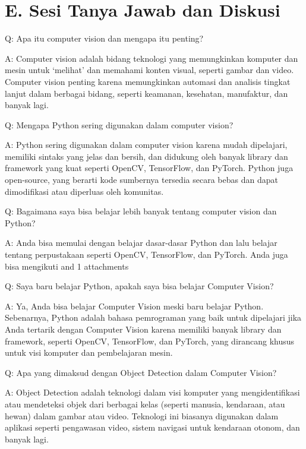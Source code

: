 \documentclass[
  letterpaper,
  DIV=11,
  numbers=noendperiod]{scrreprt}
\begin{document}
\hypertarget{e.-sesi-tanya-jawab-dan-diskusi}{%
\section*{E. Sesi Tanya Jawab dan
Diskusi}\label{e.-sesi-tanya-jawab-dan-diskusi}}


Q: Apa itu computer vision dan mengapa itu penting?

A: Computer vision adalah bidang teknologi yang memungkinkan komputer
dan mesin untuk `melihat' dan memahami konten visual, seperti gambar dan
video. Computer vision penting karena memungkinkan automasi dan analisis
tingkat lanjut dalam berbagai bidang, seperti keamanan, kesehatan,
manufaktur, dan banyak lagi.

Q: Mengapa Python sering digunakan dalam computer vision?

A: Python sering digunakan dalam computer vision karena mudah
dipelajari, memiliki sintaks yang jelas dan bersih, dan didukung oleh
banyak library dan framework yang kuat seperti OpenCV, TensorFlow, dan
PyTorch. Python juga open-source, yang berarti kode sumbernya tersedia
secara bebas dan dapat dimodifikasi atau diperluas oleh komunitas.

Q: Bagaimana saya bisa belajar lebih banyak tentang computer vision dan
Python?

A: Anda bisa memulai dengan belajar dasar-dasar Python dan lalu belajar
tentang perpustakaan seperti OpenCV, TensorFlow, dan PyTorch. Anda juga
bisa mengikuti and 1 attachments

Q: Saya baru belajar Python, apakah saya bisa belajar Computer Vision?

A: Ya, Anda bisa belajar Computer Vision meski baru belajar Python.
Sebenarnya, Python adalah bahasa pemrograman yang baik untuk dipelajari
jika Anda tertarik dengan Computer Vision karena memiliki banyak library
dan framework, seperti OpenCV, TensorFlow, dan PyTorch, yang dirancang
khusus untuk visi komputer dan pembelajaran mesin.

Q: Apa yang dimaksud dengan Object Detection dalam Computer Vision?

A: Object Detection adalah teknologi dalam visi komputer yang
mengidentifikasi atau mendeteksi objek dari berbagai kelas (seperti
manusia, kendaraan, atau hewan) dalam gambar atau video. Teknologi ini
biasanya digunakan dalam aplikasi seperti pengawasan video, sistem
navigasi untuk kendaraan otonom, dan banyak lagi.
\end{document}
